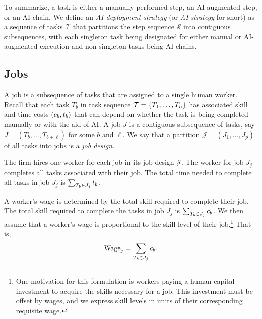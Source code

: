 To summarize, a task is either a manually-performed step, an AI-augmented step, or an AI chain. 
We define an \emph{AI deployment strategy} (or \emph{AI strategy} for short) as a sequence of tasks $\mathcal{T}$ that partitions the step sequence $\mathcal{S}$ into contiguous subsequences, with each singleton task being designated for either manual or AI-augmented execution and non-singleton tasks being AI chains.



\subsection{Jobs}
\label{sec:model.jobs}

A job is a subsequence of tasks that are assigned to a single human worker.
Recall that each task $T_b$ in task sequence $\mathcal{T} = \{T_1, \dotsc, T_n\}$ has associated skill and time costs $(c_{b}, t_{b})$ that can depend on whether the task is being completed manually or with the aid of AI.
A job $J$ is a contiguous subsequence of tasks, say $J = (T_b, \dotsc, T_{b+\ell})$ for some $b$ and $\ell$.
We say that a partition $\mathcal{J} = (J_1, \dotsc, J_p)$ of all tasks into jobs is a \emph{job design}.

The firm hires one worker for each job in its job design $\mathcal{J}$.
The worker for job $J_j$ completes all tasks associated with their job.
The total time needed to complete all tasks in job $J_j$ is $\sum_{T_b \in J_j} t_{b}$.

A worker's wage is determined by the total skill required to complete their job.
The total skill required to complete the tasks in job $J_j$ is $\sum_{T_b \in J_j} c_{b}$.
We then assume that a worker's wage is proportional to the skill level of their job.\footnote{
One motivation for this formulation is workers paying a human capital investment to acquire the skills necessary for a job. 
This investment must be offset by wages, and we express skill levels in units of their corresponding requisite wage. 
}
That is,
\begin{align}
\label{eq:wage}
\text{Wage}_j = \sum_{T_b \in J_j} c_{b}.
\end{align}

